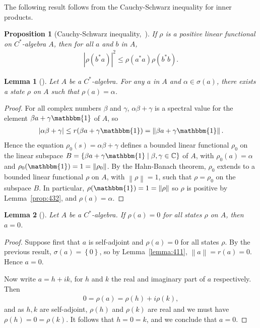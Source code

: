 \documentclass[11pt,a4paper]{report}
\theoremstyle{plain}
\newtheorem{lemma}{Lemma}
\newtheorem*{prop*}{Proposition}
\theoremstyle{definition}
\newcommand{\1}{\mathbbm{1}}
\newcommand{\C}{\mathbb{C}}
\newcommand{\spec}[1]{\sigma(#1)}
\begin{document}
The following result follows from the Cauchy-Schwarz inequality for inner 
products.
\begin{prop*}[Cauchy-Schwarz inequality,~{\cite[4.3.1]{kadison83}}]
	If $\rho$ is a positive linear functional on $C^\ast$-algebra $A$, then for all 
	$a$ and $b$ in $A$,
	\begin{align*}
		|\rho(b^\ast a)|^2 \leq \rho(a^\ast a)\rho(b^\ast b).
	\end{align*}
\end{prop*}


\begin{lemma}[{\cite[4.3.3]{kadison83}}]\label{lemma:433}
	Let $A$ be a $C^\ast$-algebra. For any $a$ in $A$ and $\alpha\in\spec{a}$, there 
	exists a state $\rho$ on $A$ such that $\rho(a)=\alpha$.
\end{lemma}
\begin{proof}
	For all complex numbers $\beta$ and $\gamma$, $\alpha\beta+\gamma$ is a spectral 
	value for the element $\beta a+\gamma\1$ of $A$, so 
	\begin{align*}
		|\alpha\beta+\gamma|\leq r(\beta a+\gamma\1)=\left\|\beta a+\gamma\1\right\|.
	\end{align*} 
	Hence the equation $\rho_0(s)=\alpha\beta+\gamma$ defines a bounded linear 
	functional $\rho_0$ on the linear subspace $B= \left\{\beta a+\gamma\1 \mid 
	\beta,\gamma\in\C\right\}$ of $A$, with $\rho_0(a) =\alpha$ and 
	$\rho_0(\1)=1=\left\|\rho_0\right\|$. By the Hahn-Banach theorem, $\rho_0$ 
	extends to a bounded linear functional $\rho$ on $A$, with 
	$\left\|\rho\right\|=1$, such that $\rho=\rho_0$ on the subspace $B$. In 
	particular, $\rho(\1)=1=\left\|\rho\right\|$ so $\rho$ is positive by 
	Lemma~\ref{prop:432}, and $\rho(a)=\alpha$.
\end{proof}

\begin{lemma}[{\cite[4.3.4,(i)]{kadison83}}]\label{lemma:state1}
	Let $A$ be a $C^\ast$-algebra. If $\rho(a)=0$ for all states $\rho$ on $A$, 
	then $a=0$.
\end{lemma}
\begin{proof}
	Suppose first that $a$ is self-adjoint and $\rho(a)=0$ for all states $\rho$. 
	By the previous result, $\spec{a}=\left\{0\right\}$, so by Lemma~\ref{lemma:411},
	$\left\|a\right\|=r(a)=0$. Hence $a=0$.

	Now write $a=h+ik$, for $h$ and $k$ the real and imaginary part of $a$ 
	respectively. Then
	\begin{align*}
		0=\rho(a)=\rho(h)+i\rho(k),
	\end{align*}
	and as $h,k$ are self-adjoint, $\rho(h)$ and $\rho(k)$ are real and we must have 
	$\rho(h)=0=\rho(k)$. It follows that $h=0=k$, and we conclude that $a=0$.
\end{proof}
\end{document}
